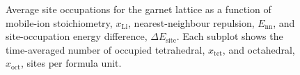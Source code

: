 \documentclass[aps,prb,twocolumn,superscriptaddress,reprint]{revtex4-1}
\newcommand{\xLi}{x_\m{Li}}
\newcommand{\m}[1]{\mathrm{#1}}
\begin{document}
\begin{figure}[tb]
  \centering
    \caption{\label{fig:site_occupation_miniplots}Average site occupations for the garnet lattice as a function of mobile-ion stoichiometry, $\xLi$, nearest-neighbour repulsion, $E_\m{nn}$, and site-occupation energy difference, $\Delta E_\m{site}$. Each subplot shows the time-averaged number of occupied tetrahedral, $x_\m{tet}$, and octahedral, $x_\m{oct}$, sites per formula unit.}
\end{figure}
\end{document}
